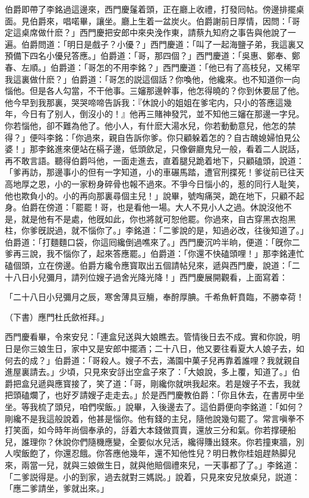 伯爵即帶了李銘過這邊來，西門慶鬔着頭，正在廳上收禮，打發囘帖。傍邊排擺桌面。見伯爵來，唱喏畢，讓坐。廳上生着一盆炭火。伯爵謝前日厚情，因問：「哥定這桌席做什麽？」西門慶把安郎中來央浼作東，請蔡九知府之事告與他說了一遍。伯爵問道：「明日是戲子？小優？」西門慶道：「叫了一起海鹽子弟，我這裏又預備下四名小優兒答應。」伯爵道：「哥，那四個？」西門慶道：「吳惠、鄭奉、鄭春、左順。」伯爵道：「哥怎的不用李銘？」西門慶道：「他已有了高枝兒，又稀罕我這裏做什麽？」伯爵道：「哥怎的説這個話？你喚他，他纔來。也不知道你一向惱他。但是各人勾當，不干他事。三嬸那邊幹事，他怎得曉的？你到休要屈了他。他今早到我那裏，哭哭啼啼告訴我：『休說小的姐姐在爹宅内，只小的答應這幾年，今日有了别人，倒沒小的！』他再三賭神發咒，並不知他三嬸在那邊一字兒。你若惱他，卻不難為他了。他小人，有什麽大湯水兒，你若動動意兒，他怎的禁得？」便呌李銘：「你過來，親自告訴你爹。你只顧躲着怎的？自古醜媳婦怕見公婆！」那李銘進來便站在槅子邊，低頭歛足，只像僻廳鬼兒一般，看着二人説話，再不敢言語。聽得伯爵呌他，一面走進去，直着腿兒跪着地下，只顧磕頭，說道：「爹再訪，那邊事小的但有一字知道，小的車碾馬踏，遭官刑揲死！爹従前已往天高地厚之恩，小的一家粉身碎骨也報不過來。不爭今日惱小的，惹的同行人耻笑，他也欺負小的。小的再向那裏尋個主兒！」說畢，號啕痛哭，跪在地下，只顧不起身。伯爵在傍道：「罷罷！哥，也是看他一場。大人不見小人之過。休說沒他不是，就是他有不是處，他旣如此，你也將就可恕他罷。你過來，自古穿黑衣抱黑柱，你爹旣説過，就不惱你了。」李銘道：「二爹說的是，知過必改，往後知道了。」伯爵道：「打麵麵口袋，你這囘纔倒過噍來了。」西門慶沉吟半晌，便道：「旣你二爹再三說，我不惱你了，起來答應罷。」伯爵道：「你還不快磕頭哩！」那李銘連忙磕個頭，立在傍邊。伯爵方纔令應寳取出五個請帖兒來，遞與西門慶，說道：「二十八日小兒彌月，請列位嫂子過舍光降光降！」西門慶展開觀看，上面寫着：

「二十八日小兒彌月之辰，寒舍薄具豆觴，奉酧厚腆。千希魚軒賁臨，不勝幸荷！

（下書）應門杜氏歛袵拜。」

西門慶看畢，令來安兒：「連盒兒送與大娘瞧去。管情後日去不成。實和你說，明日是你三娘生日，家中又是安郎中擺酒；二十八日，他又要往看夏大人娘子去，如何去的成？」伯爵道：「哥殺人。嫂子不去，滿園中菓子兒再靠着誰哩？我就親自進屋裏請去。」少頃，只見來安㧱出空盒子來了：「大娘說，多上覆，知道了。」伯爵把盒兒遞與應寳接了，笑了道：「哥，剛纔你就哄我起來。若是嫂子不去，我就把頭磕爛了，也好歹請嫂子走走去。」於是西門慶教伯爵：「你且休去，在書房中坐坐。等我梳了頭兒，咱們喫飯。」說畢，入後邊去了。這伯爵便向李銘道：「如何？剛纔不是我這般說着，他甚是惱你。他有錢的主兒，隨他說幾句罷了。常言嗔拳不打笑面，如今時年尚個奉承的，㧱着大本錢做買賣，還放三分和氣。你若撑硬船兒，誰理你？休說你們隨機應變，全要似水兒活，纔得賺出錢來。你若撞東牆，別人喫飯飽了，你還忍餓。你答應他幾年，還不知他性兒？明日教你桂姐趕熱脚兒來，兩當一兒，就與三娘做生日，就與他賠個禮來兒，一天事都了了。」李銘道：「二爹説得是。小的到家，過去就對三媽説。」說着，只見來安兒放桌兒，説道：「應二爹請坐，爹就出來。」

